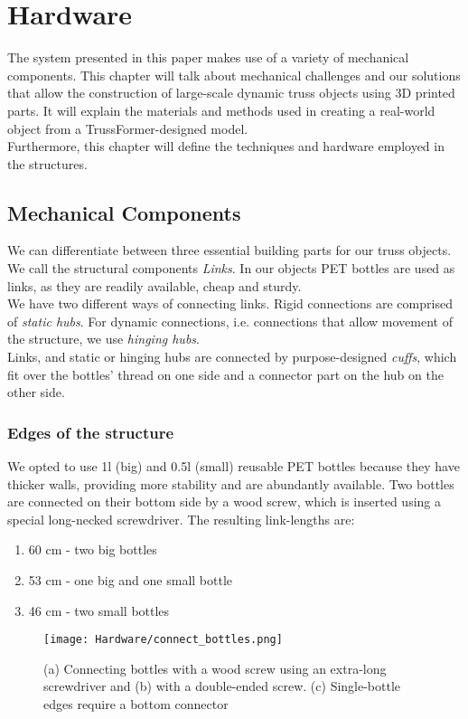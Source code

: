\chapter{Hardware}\label{ch:hardware}
The system presented in this paper makes use of a variety of mechanical components. This chapter will talk about mechanical challenges and our solutions that allow the construction of large-scale dynamic truss objects using 3D printed parts. It will explain the materials and methods used in creating a real-world object from a TrussFormer-designed model.\\
Furthermore, this chapter will define the techniques and hardware employed in the structures.

\section{Mechanical Components}
We can differentiate between three essential building parts for our truss objects. We call the structural components \textit{Links}. In our objects PET bottles are used as links, as they are readily available, cheap and sturdy.\\
We have two different ways of connecting links. Rigid connections are comprised of \textit{static hubs}. For dynamic connections, i.e. connections that allow movement of the structure, we use \textit{hinging hubs}.\\
Links, and static or hinging hubs are connected by purpose-designed \textit{cuffs}, which fit over the bottles' thread on one side and a connector part on the hub on the other side.

\subsection{Edges of the structure}
We opted to use 1l (big) and 0.5l (small) reusable PET bottles because they have thicker walls, providing more stability and are abundantly available. Two bottles are connected on their bottom side by a wood screw, which is inserted using a special long-necked screwdriver. The resulting link-lengths are:
\begin{enumerate}
\item 60 cm - two big bottles
\item 53 cm - one big and one small bottle
\item 46 cm - two small bottles
\end{enumerate}

\begin{figure}[h!]
    \texttt{[image: Hardware/connect\_bottles.png]}
    \centering
    \caption{(a) Connecting bottles with a wood screw using an extra-long screwdriver and (b) with a double-ended screw. (c) Single-bottle edges require a bottom connector}
    \label{fig:connect_bottles}
\end{figure}

